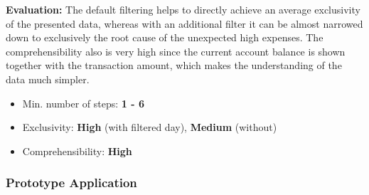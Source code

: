 \textbf{Evaluation:} The default filtering helps to directly achieve an average exclusivity of the presented data, whereas with an additional filter it can be almost narrowed down to exclusively the root cause of the unexpected high expenses. The comprehensibility also is very high since the current account balance is shown together with the transaction amount, which makes the understanding of the data much simpler.
\begin{itemize}[noitemsep,nolistsep]
	\item Min. number of steps: \textbf{1 - 6}
	\item Exclusivity: \textbf{High} (with filtered day), \textbf{Medium} (without)
	\item Comprehensibility: \textbf{High}
\end{itemize}



\subsubsection{Prototype Application}

